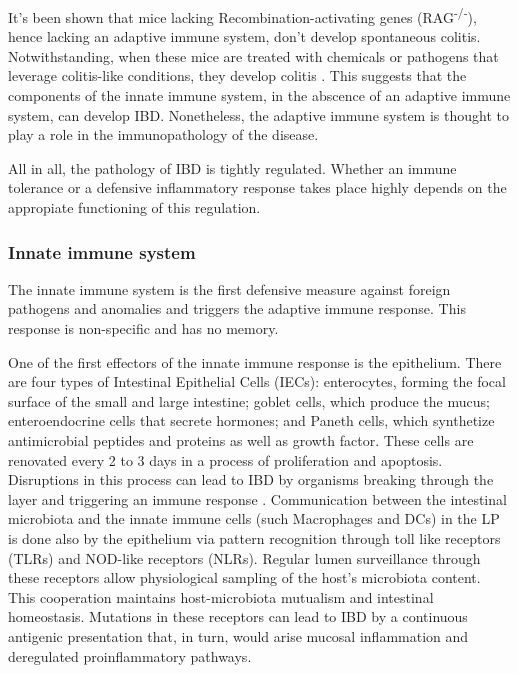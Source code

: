 \documentclass[../main.tex]{subfiles}
\begin{document}
It's been shown that mice lacking Recombination-activating genes (RAG\textsuperscript{-/-}), hence lacking an adaptive immune system, don't develop spontaneous colitis. Notwithstanding, when these mice are treated with chemicals or pathogens that leverage colitis-like conditions, they develop colitis \citep{buonocore_innate_2010}. This suggests that the components of the innate immune system, in the abscence of an adaptive immune system, can develop IBD. Nonetheless, the adaptive immune system is thought to play a role in the immunopathology of the disease.

All in all, the pathology of IBD is tightly regulated. Whether an immune tolerance or a defensive inflammatory response takes place highly depends on the appropiate functioning of this regulation. 

\subsubsection{Innate immune system}

The innate immune system is the first defensive measure against foreign pathogens and anomalies and triggers the adaptive immune response. This response is non-specific and has no memory.

One of the first effectors of the innate immune response is the epithelium. There are four types of Intestinal Epithelial Cells (IECs): enterocytes, forming the focal surface of the small and large intestine; goblet cells, which produce the mucus; enteroendocrine cells that secrete hormones; and Paneth cells, which synthetize antimicrobial peptides and proteins as well as growth factor. These cells are renovated every 2 to 3 days in a process of proliferation and apoptosis. Disruptions in this process can lead to IBD by organisms breaking through the layer and triggering an immune response \citep{sartor_mechanisms_2006}.  Communication between the intestinal microbiota and the innate immune cells (such Macrophages and DCs) in the LP is done also by the epithelium via pattern recognition through toll like receptors (TLRs) and NOD-like receptors (NLRs). Regular lumen surveillance through these receptors allow physiological sampling of the host's microbiota content. This cooperation maintains host-microbiota mutualism \citep{slack_innate_2009} and intestinal homeostasis. Mutations in these receptors \citep{saruta_high-frequency_2009, natividad_commensal_2012} can lead to IBD by a continuous antigenic presentation that, in turn, would arise mucosal inflammation and deregulated proinflammatory pathways.
\end{document}
